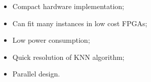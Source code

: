 \begin{itemize}
\item Compact hardware implementation;
\item Can fit many instances in low cost FPGAs;
\item Low power consumption;
\item Quick resolution of KNN algorithm;
\item Parallel design.
\end{itemize}
